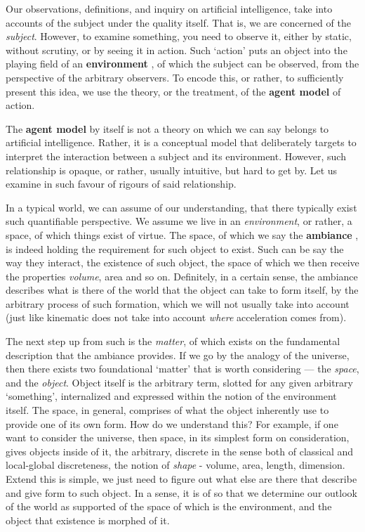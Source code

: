 Our observations, definitions, and inquiry on artificial intelligence, take into accounts of the subject under the quality itself. That is, we are concerned of the \textit{subject}. However, to examine something, you need to observe it, either by static, without scrutiny, or by seeing it in action. Such `action' puts an object into the playing field of an \textbf{environment}  , of which the subject can be observed, from the perspective of the arbitrary observers. To encode this, or rather, to sufficiently present this idea, we use the theory, or the treatment, of the \textbf{agent model} of action. 

The \textbf{agent model}  by itself is not a theory on which we can say belongs to artificial intelligence. Rather, it is a conceptual model that deliberately targets to interpret the interaction between a subject and its environment. However, such relationship is opaque, or rather, usually intuitive, but hard to get by. Let us examine in such favour of rigours of said relationship. 

In a typical world, we can assume of our understanding, that there typically exist such quantifiable perspective. We assume we live in an \textit{environment}, or rather, a space, of which things exist of virtue. The space, of which we say the \textbf{ambiance} , is indeed holding the requirement for such object to exist. Such can be say the way they interact, the existence of such object, the space of which we then receive the properties \textit{volume}, area and so on. Definitely, in a certain sense, the ambiance describes what is there of the world that the object can take to form itself, by the arbitrary process of such formation, which we will not usually take into account (just like kinematic does not take into account \textit{where} acceleration comes from). 

The next step up from such is the \textit{matter}, of which exists on the fundamental description that the ambiance provides. If we go by the analogy of the universe, then there exists two foundational `matter' that is worth considering --- the \textit{space}, and the \textit{object}. Object itself is the arbitrary term, slotted for any given arbitrary `something', internalized and expressed within the notion of the environment itself. The space, in general, comprises of what the object inherently use to provide one of its own form. How do we understand this? For example, if one want to consider the universe, then space, in its simplest form on consideration, gives objects inside of it, the arbitrary, discrete in the sense both of classical and local-global discreteness, the notion of \textit{shape} - volume, area, length, dimension. Extend this is simple, we just need to figure out what else are there that describe and give form to such object. In a sense, it is of so that we determine our outlook of the world as supported of the space of which is the environment, and the object that existence is morphed of it. 

